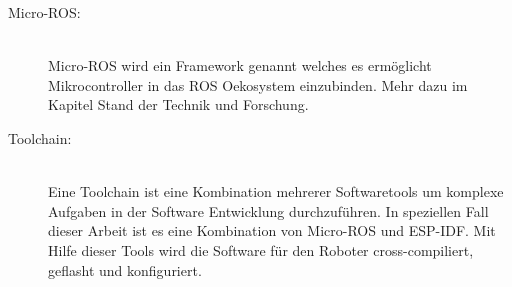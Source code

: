 \begin{flushleft}
\begin{description}
        \item[Micro-ROS:]\hfill\\
        Micro-ROS wird ein Framework genannt welches es ermöglicht Mikrocontroller in das ROS Oekosystem einzubinden.
        Mehr dazu im Kapitel Stand der Technik und Forschung. \cite{micro_ros}

        \item[Toolchain:] \hfill\\
        Eine Toolchain ist eine Kombination mehrerer Softwaretools um komplexe Aufgaben in der Software Entwicklung durchzuführen.
        In speziellen Fall dieser Arbeit ist es eine Kombination von Micro-ROS und ESP-IDF.
        Mit Hilfe dieser Tools wird die Software für den Roboter cross-compiliert, geflasht und konfiguriert.

        \end{description}
\end{flushleft}